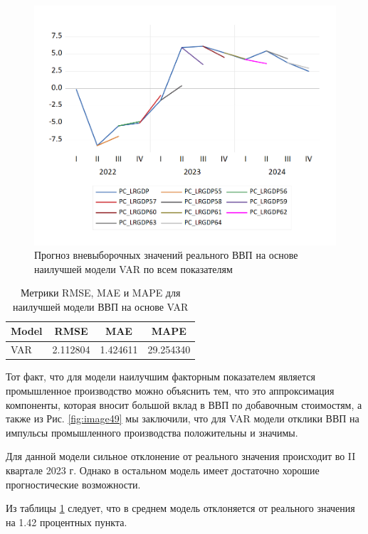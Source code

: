 \documentclass[a4paper, 14pt]{extreport}
\numberwithin{equation}{section}
\numberwithin{equation}{section}
\begin{document}
	\begin{figure}[h!]
		\centering
		\includegraphics[scale=0.7]{images/image50}
		\caption{Прогноз вневыборочных значений реального ВВП на основе наилучшей модели VAR по всем показателям}
		\label{fig:image50}
	\end{figure}
	
	\begin{table}[h!]
		\centering
		\caption{Метрики RMSE, MAE и MAPE для наилучшей модели ВВП на основе VAR}
		\begin{tabular}{lccc}
			\toprule
			\textbf{Model} & \textbf{RMSE} & \textbf{MAE} & \textbf{MAPE} \\ 
			\midrule
			VAR & 2.112804 & 1.424611 & 29.254340 \\ 
			\bottomrule
		\end{tabular}
		\label{tab:mfvar-metrics-2}
	\end{table}
	
	Тот факт, что для модели наилучшим факторным показателем является промышленное производство можно объяснить тем, что это аппроксимация компоненты, которая вносит большой вклад в ВВП по добавочным стоимостям, а также из Рис. \ref{fig:image49} мы заключили, что для VAR модели отклики ВВП на импульсы промышленного производства положительны и значимы.
	
	Для данной модели сильное отклонение от реального значения происходит во II квартале 2023 г. Однако в остальном модель имеет достаточно хорошие прогностические возможности.
	
	Из таблицы \ref{tab:mfvar-metrics-2} следует, что в среднем модель отклоняется от реального значения на 1.42 процентных пункта.
	
\end{document}
